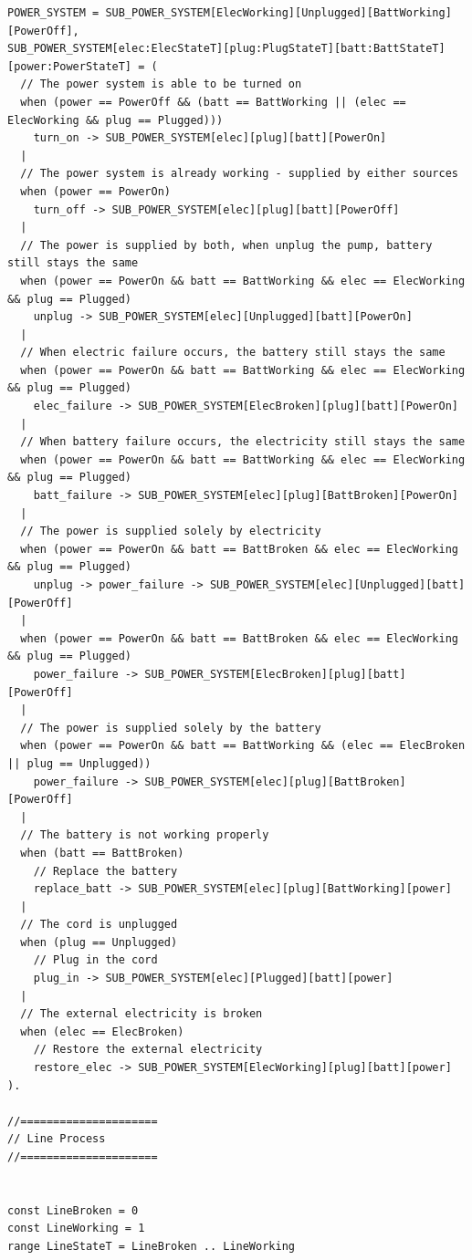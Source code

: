 \documentclass[titlepage]{article}
\begin{document}
\begin{verbatim}
POWER_SYSTEM = SUB_POWER_SYSTEM[ElecWorking][Unplugged][BattWorking][PowerOff],
SUB_POWER_SYSTEM[elec:ElecStateT][plug:PlugStateT][batt:BattStateT][power:PowerStateT] = (
  // The power system is able to be turned on
  when (power == PowerOff && (batt == BattWorking || (elec == ElecWorking && plug == Plugged)))
    turn_on -> SUB_POWER_SYSTEM[elec][plug][batt][PowerOn]
  |
  // The power system is already working - supplied by either sources
  when (power == PowerOn)
    turn_off -> SUB_POWER_SYSTEM[elec][plug][batt][PowerOff]
  |
  // The power is supplied by both, when unplug the pump, battery still stays the same
  when (power == PowerOn && batt == BattWorking && elec == ElecWorking && plug == Plugged)
    unplug -> SUB_POWER_SYSTEM[elec][Unplugged][batt][PowerOn]
  |
  // When electric failure occurs, the battery still stays the same
  when (power == PowerOn && batt == BattWorking && elec == ElecWorking && plug == Plugged)
    elec_failure -> SUB_POWER_SYSTEM[ElecBroken][plug][batt][PowerOn]
  |
  // When battery failure occurs, the electricity still stays the same
  when (power == PowerOn && batt == BattWorking && elec == ElecWorking && plug == Plugged)
    batt_failure -> SUB_POWER_SYSTEM[elec][plug][BattBroken][PowerOn]
  |
  // The power is supplied solely by electricity
  when (power == PowerOn && batt == BattBroken && elec == ElecWorking && plug == Plugged)
    unplug -> power_failure -> SUB_POWER_SYSTEM[elec][Unplugged][batt][PowerOff]
  |
  when (power == PowerOn && batt == BattBroken && elec == ElecWorking && plug == Plugged)
    power_failure -> SUB_POWER_SYSTEM[ElecBroken][plug][batt][PowerOff]
  |
  // The power is supplied solely by the battery
  when (power == PowerOn && batt == BattWorking && (elec == ElecBroken || plug == Unplugged))
    power_failure -> SUB_POWER_SYSTEM[elec][plug][BattBroken][PowerOff]
  |
  // The battery is not working properly
  when (batt == BattBroken)
    // Replace the battery
    replace_batt -> SUB_POWER_SYSTEM[elec][plug][BattWorking][power]
  |
  // The cord is unplugged
  when (plug == Unplugged)
    // Plug in the cord
    plug_in -> SUB_POWER_SYSTEM[elec][Plugged][batt][power]
  |
  // The external electricity is broken
  when (elec == ElecBroken)
    // Restore the external electricity
    restore_elec -> SUB_POWER_SYSTEM[ElecWorking][plug][batt][power]
).

//=====================
// Line Process 
//=====================


const LineBroken = 0
const LineWorking = 1
range LineStateT = LineBroken .. LineWorking


\end{verbatim}
\end{document}

